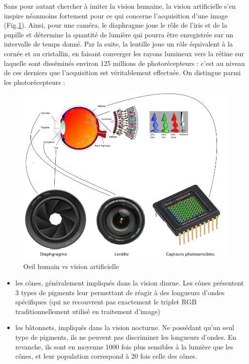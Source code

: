 Sans pour autant chercher à imiter la vision humaine, la vision artificielle 
s'en inspire néanmoins fortement pour ce qui concerne l'acquisition d'une 
image (Fig.\ref{chap01:fig01}). Ainsi, pour une caméra, le diaphragme joue le 
rôle de l'iris et de la 
pupille et détermine la quantité de lumière qui pourra être enregistrée sur un 
intervalle de temps donné. Par la suite, la lentille joue un rôle équivalent à 
la cornée et au cristallin, en faisant converger les rayons lumineux vers la 
rétine sur laquelle sont disséminés environ 125 millions de photorécepteurs : 
c'est au niveau de ces derniers que l'acquisition est véritablement effectuée. 
On distingue parmi les photorécepteurs :
 \begin{figure}[htp]
  \centering
  \includegraphics[width=.95\linewidth]{./chapter01/figures/oeil.png}
    \caption{\footnotesize{Oeil humain vs vision artificielle}}
\label{chap01:fig01}
\end{figure}

 \begin{itemize}
  \item les cônes, généralement impliqués dans la vision diurne. Les cônes 
présen\-tent 3 types de pigments leur permettant de réagir à des longueurs 
d'ondes spécifiques (qui ne recouvrent pas exactement le triplet RGB 
traditionnellement utilisé en traitement d'image)
  \item les bâtonnets, impliqués dans la vision nocturne. Ne possédant qu'un 
seul type de pigments, ils ne peuvent pas discriminer les longueurs d'ondes. En 
revanche, ils sont en moyenne 1000 fois plus sensibles à la lumière que les 
cônes, et leur population correspond à 20 fois celle des cônes.
 \end{itemize}

